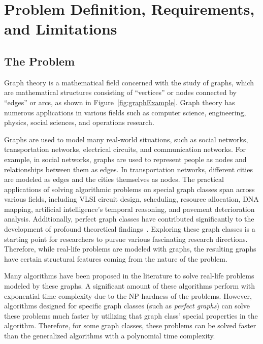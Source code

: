 \section{Problem Definition, Requirements, and Limitations}

\subsection{The Problem}

Graph theory is a mathematical field concerned with the study of graphs, which are mathematical structures consisting of ``vertices'' or nodes connected by ``edges'' or arcs, as shown in Figure~\ref{fig:graphExample}. Graph theory has numerous applications in various fields such as computer science, engineering, physics, social sciences, and operations research.



Graphs are used to model many real-world situations, such as social networks, transportation networks, electrical circuits, and communication networks. For example, in social networks, graphs are used to represent people as nodes and relationships between them as edges. In transportation networks, different cities are modeled as edges and the cities themselves as nodes. 
The practical applications of solving algorithmic problems on special graph classes span across various fields, including VLSI circuit design, scheduling, resource allocation, DNA mapping, artificial intelligence's temporal reasoning, and pavement deterioration analysis. Additionally, perfect graph classes have contributed significantly to the development of profound theoretical findings~\cite{golumbic}. Exploring these graph classes is a starting point for researchers to pursue various fascinating research directions. Therefore, while real-life problems are modeled with graphs, the resulting graphs have certain structural features coming from the nature of the problem.

Many algorithms have been proposed in the literature to solve real-life problems modeled by these graphs. A significant amount of these algorithms perform with exponential time complexity due to the NP-hardness of the problems. However, algorithms designed for specific graph classes (such as \textit{perfect graphs}) can solve these problems much faster by utilizing that graph class' special properties in the algorithm. Therefore, for some graph classes, these problems can be solved faster than the generalized algorithms with a polynomial time complexity.

